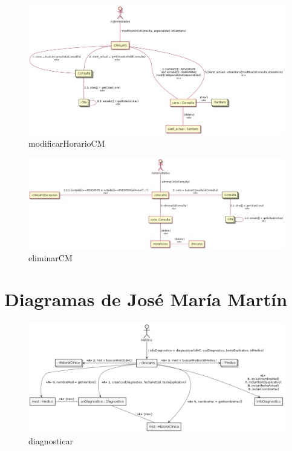 \documentclass[11pt,a4paper]{article}
\begin{document}
\begin{figure}[H]
	\caption{modificarHorarioCM}
	\centering
	\includegraphics[width=\textwidth,height=\textheight,keepaspectratio]{Diagramas/modificarHorarioCM}
\end{figure}


\begin{figure}[H]
	\caption{eliminarCM}
	\centering
	\includegraphics[width=\textwidth,height=\textheight,keepaspectratio]{Diagramas/eliminarCM}
\end{figure}


\section{Diagramas de José María Martín}

\begin{figure}[H]
	\caption{diagnosticar}
	\centering
	\includegraphics[width=\textwidth,height=\textheight,keepaspectratio]{Diagramas/diagnosticar}
\end{figure}
\end{document}
